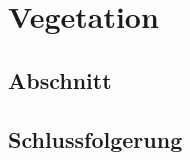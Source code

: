 %
%
%
\chapter{Vegetation\label{chapter:thema}}
\begin{refsection}

\section{Abschnitt}

\section{Schlussfolgerung}

\printbibliography[heading=subbibliography]
\end{refsection}
